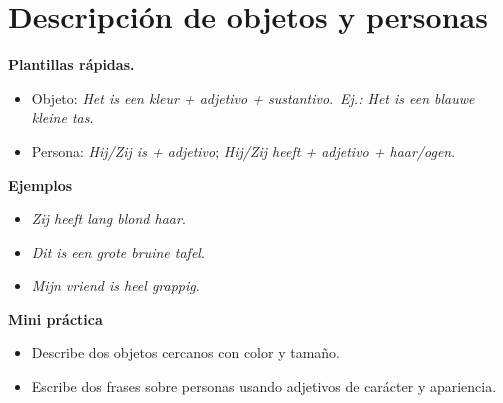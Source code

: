 \section{Descripción de objetos y personas}
\textbf{Plantillas rápidas.}
\begin{itemize}[leftmargin=*]
  \item Objeto: \textit{Het is een \textit{kleur} + \textit{adjetivo} + \textit{sustantivo}}.\ \textit{Ej.: Het is een blauwe kleine tas}.
  \item Persona: \textit{Hij/Zij is + adjetivo}; \textit{Hij/Zij heeft + adjetivo + haar/ogen}.
\end{itemize}

\textbf{Ejemplos}
\begin{itemize}[leftmargin=*]
  \item \textit{Zij heeft lang blond haar}.
  \item \textit{Dit is een grote bruine tafel}.
  \item \textit{Mijn vriend is heel grappig}.
\end{itemize}

\textbf{Mini práctica}
\begin{itemize}[leftmargin=*]
  \item Describe dos objetos cercanos con color y tamaño.
  \item Escribe dos frases sobre personas usando adjetivos de carácter y apariencia.
\end{itemize}
